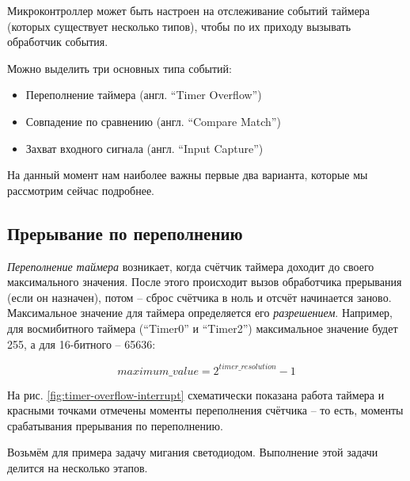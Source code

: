 \documentclass[../sparc.tex]{subfiles}
\begin{document}
Микроконтроллер может быть настроен на отслеживание событий таймера (которых
существует несколько типов), чтобы по их приходу вызывать обработчик события.

Можно выделить три основных типа событий:
\begin{itemize}
\item Переполнение таймера (англ. ``Timer Overflow'')
\item Совпадение по сравнению (англ. ``Compare Match'')
\item Захват входного сигнала (англ. ``Input Capture'')
\end{itemize}

На данный момент нам наиболее важны первые два варианта, которые мы рассмотрим
сейчас подробнее.

\subsection{Прерывание по переполнению}


\emph{Переполнение таймера} возникает, когда счётчик таймера доходит до своего
максимального значения.  После этого происходит вызов обработчика прерывания
(если он назначен), потом -- сброс счётчика в ноль и отсчёт начинается заново.
Максимальное значение для таймера определяется его \emph{разрешением}.
Например, для восмибитного таймера (``Timer0'' и ``Timer2'') максимальное
значение будет 255, а для 16-битного -- 65636:

\begin{equation}
  maximum\_value = 2^{timer\_resolution} - 1
\end{equation}

На рис. \ref{fig:timer-overflow-interrupt} схематически показана работа таймера
и красными точками отмечены моменты переполнения счётчика -- то есть, моменты
срабатывания прерывания по переполнению.

Возьмём для примера задачу мигания светодиодом.  Выполнение этой задачи делится
на несколько этапов.
\end{document}
